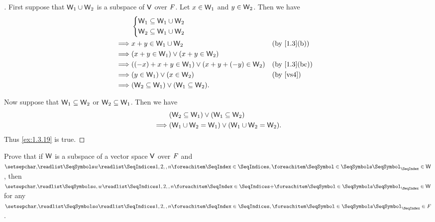 \begin{proof}[]
	First suppose that \(\mathsf{W}_1 \cup \mathsf{W}_2\) is a subspace of \(\mathsf{V}\) over \(\mathit{F}\).
	Let \(x \in \mathsf{W}_1\) and \(y \in \mathsf{W}_2\).
	Then we have
	\begin{align*}
		         & \begin{dcases}
			           \W_1 \subseteq \W_1 \cup \W_2 \\
			           \W_2 \subseteq \W_1 \cup \W_2
		           \end{dcases}                                                   \\
		\implies & x + y \in \W_1 \cup \W_2                             &  & \by{1.3}[b]           \\
		\implies & (x + y \in \W_1) \lor (x + y \in \W_2)                                          \\
		\implies & ((-x) + x + y \in \W_1) \lor (x + y + (-y) \in \W_2) &  & \by{1.3}[bc]          \\
		\implies & (y \in \W_1) \lor (x \in \W_2)                       &  & \text{(by \ref{vs4})} \\
		\implies & (\W_2 \subseteq \W_1) \lor (\W_1 \subseteq \W_2).
	\end{align*}

	Now suppose that \(\mathsf{W}_1 \subseteq \mathsf{W}_2\) or \(\mathsf{W}_2 \subseteq \mathsf{W}_1\).
	Then we have
	\begin{align*}
		         & (\mathsf{W}_2 \subseteq \mathsf{W}_1) \lor (\mathsf{W}_1 \subseteq \mathsf{W}_2)      \\
		\implies & (\mathsf{W}_1 \cup \mathsf{W}_2 = \mathsf{W}_1) \lor (\mathsf{W}_1 \cup \mathsf{W}_2 = \mathsf{W}_2).
	\end{align*}
	Thus \cref{ex:1.3.19} is true.
\end{proof}

\begin{ex}\label{ex:1.3.20}
	Prove that if \(\mathsf{W}\) is a subspace of a vector space \(\mathsf{V}\) over \(\mathit{F}\) and \(\seq{w}{1,2,,n} \in \W\), then \(\seq[+]{a,w}{1,2,,n} \in \W\) for any \(\seq{a}{1,2,,n} \in \F\).
\end{ex}


